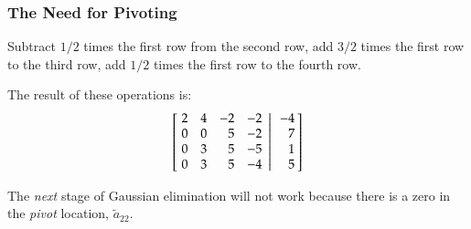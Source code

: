 \documentclass[10pt]{beamer}
\begin{document}
\begin{frame}
\frametitle{The Need for Pivoting}

Subtract $1/2$ times the first row from the second row,\newline
add $3/2$ times the first row to the third row,\newline
add $1/2$ times the first row to the fourth row.

The result of these operations is:
\begin{equation*}
    \left[
           \left.\negthickspace\begin{array}{rrrr}  2 &  4 & -2 & -2 \\
                                                    0 &  0 &  5 & -2 \\
                                                    0 &  3 &  5 & -5 \\
                                                    0 &  3 &  5 & -4 \end{array}
           \right|\begin{array}{r} -4 \\ 7 \\ 1 \\ 5 \end{array}\negthickspace\right]
\end{equation*}

The \emph{next} stage of Gaussian elimination will not work because
there is a zero in the \emph{pivot} location, $\tilde{a}_{22}$.

\end{frame}
\end{document}
